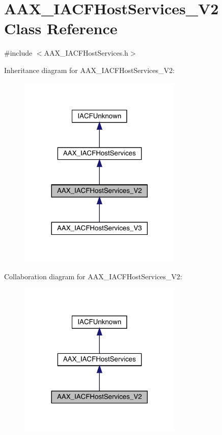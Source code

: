 \hypertarget{a01717}{}\section{A\+A\+X\+\_\+\+I\+A\+C\+F\+Host\+Services\+\_\+\+V2 Class Reference}
\label{a01717}


{\ttfamily \#include $<$A\+A\+X\+\_\+\+I\+A\+C\+F\+Host\+Services.\+h$>$}



Inheritance diagram for A\+A\+X\+\_\+\+I\+A\+C\+F\+Host\+Services\+\_\+\+V2\+:
\nopagebreak
\begin{figure}[H]
\begin{center}
\leavevmode
\includegraphics[width=221pt]{a01716}
\end{center}
\end{figure}


Collaboration diagram for A\+A\+X\+\_\+\+I\+A\+C\+F\+Host\+Services\+\_\+\+V2\+:
\nopagebreak
\begin{figure}[H]
\begin{center}
\leavevmode
\includegraphics[width=221pt]{a01715}
\end{center}
\end{figure}


